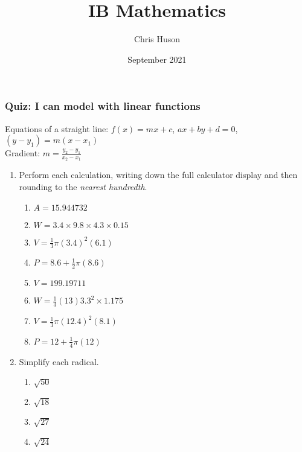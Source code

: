 \documentclass[12pt, twoside]{article}
\title{IB Mathematics}
\author{Chris Huson}
\date{September 2021}
\begin{document}
\subsubsection*{Quiz: I can model with linear functions}
Equations of a straight line: $f(x)=mx+c$, $ax+by+d=0$, $(y-y_1)=m(x-x_1)$\\[0.25cm]
Gradient: $\displaystyle m=\frac{y_2-y_1}{x_2-x_1}$ \vspace{1cm}
\begin{enumerate}
  \item Perform each calculation, writing down the full calculator display and then rounding to the \emph{nearest hundredth}.
  \begin{multicols}{2}
  \begin{enumerate}[itemsep=4cm]
    \item $A=15.944732$
    \item $W=3.4 \times 9.8 \times 4.3 \times 0.15$
          
    \item $V=\frac{1}{3} \pi (3.4)^2(6.1)$
    \item $P=8.6 + \frac{1}{2} \pi (8.6)$  
    \item $V=199.19711$
    \item $W=\frac{1}{3} (13)  3.3^2 \times 1.175$
    \item $V=\frac{1}{3} \pi (12.4)^2(8.1)$
    \item $P=12 + \frac{1}{4} \pi (12)$ 
  \end{enumerate}
  \end{multicols}\vspace{2cm}

\newpage
\item Simplify each radical.
  \begin{multicols}{2}
    \begin{enumerate}[itemsep=2cm]
      \item $\sqrt{50}$ 
      \item $\sqrt{18}$
      \item $\sqrt{27}$ 
      \item $\sqrt{24}$ 
    \end{enumerate}
    \end{multicols}\vspace{2cm}
    


\end{enumerate}
\end{document}

